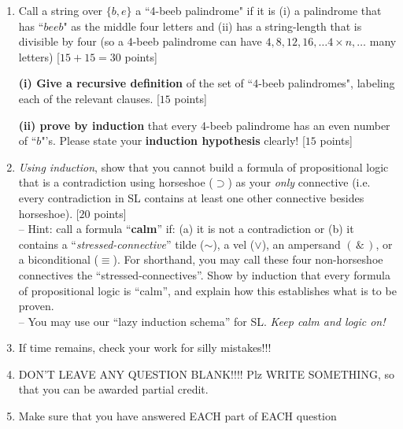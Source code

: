\documentclass[12pt]{article}
\def\eor{\ensuremath{\vee}}
\def\eand{\ensuremath{\,\&\,}}
\def\eif{\ensuremath{\supset}}
\def\eiff{\ensuremath{\equiv}}
\def\enot{\ensuremath{{\sim}}} %
\let\oldsim\sim %
\renewcommand{\sim}{{\oldsim}} %
\begin{document}
\begin{enumerate}
\newpage

\item Call a string over $\{b, e\}$ a ``4-beeb palindrome" if it is (i) a palindrome that has ``$beeb$" as the middle four letters and (ii) has a string-length that is divisible by four (so a 4-beeb palindrome can have $4, 8, 12, 16, \dots 4 \times n, \dots$ many letters) [$15+15 = 30$ points]

\textbf{(i) Give a recursive definition} of the set of ``4-beeb palindromes", labeling each of the relevant clauses. [$15$ points]

\textbf{(ii) prove by induction} that every 4-beeb palindrome has an even number of ``$b$"'s. Please state your \textbf{induction hypothesis} clearly! [$15$ points] \\

\item \textit{Using induction}, show that you cannot build a formula of propositional logic that is a contradiction using horseshoe (\eif) as your \textit{only} connective (i.e. every contradiction in SL contains at least one other connective besides horseshoe). [$20$ points] \\ 

-- Hint: call a formula ``\textbf{calm}'' if: (a) it is not a contradiction or (b) it
contains a ``\textit{stressed-connective}'' tilde (\enot), a vel (\eor), an ampersand $(\eand)$, or a biconditional (\eiff). For shorthand, you may call these four non-horseshoe connectives the ``stressed-connectives''. Show by induction that every formula of propositional logic is ``calm'', and explain how this establishes what is to be proven. \\

-- You may use our ``lazy induction schema'' for SL. \textit{Keep calm and logic on!} \\


\item[] If time remains, check your work for silly mistakes!!!

\item[] DON'T LEAVE ANY QUESTION BLANK!!!! Plz WRITE SOMETHING, so that you can be awarded partial credit. 

\item[] Make sure that you have answered EACH part of EACH question


\end{enumerate}
\end{document}
